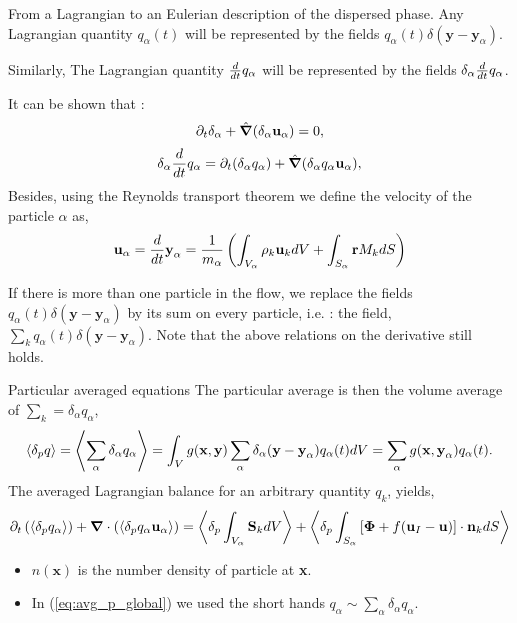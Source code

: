 \documentclass{sintefbeamer}
\newcommand{\nablab}{\bm{\nabla}}
\newcommand{\nablabh}{\hat{\bm{\nabla}}}
\begin{document}
\begin{frame}{From a Lagrangian to an Eulerian description of the dispersed phase.}
  Any Lagrangian quantity $q_\alpha(t)$ will be represented by the fields $q_\alpha(t)\delta(\textbf{y}-\textbf{y}_\alpha)$.

  Similarly, The Lagrangian quantity $\frac{d}{dt} q_\alpha$ will be represented by the fields $\delta_\alpha \frac{d}{dt} q_\alpha$.

  It can be shown that : 
  \begin{equation*}
    \pddt \delta_\alpha
    + \nablabh (\delta_\alpha \textbf{u}_\alpha)
    = 0,
    \label{eq:delta_q_alpha_dt}
\end{equation*}
\begin{equation*}
    \delta_\alpha \ddt q_\alpha
    = \pddt (\delta_\alpha q_\alpha)
    + \nablabh (\delta_\alpha q_\alpha \textbf{u}_\alpha),
    \label{eq:delta_q_alpha_dt}
\end{equation*}
Besides, using the Reynolds transport theorem we define the velocity of the particle $\alpha$ as,  
\begin{equation*}
  \textbf{u}_\alpha
  = \frac{d}{dt} \textbf{y}_\alpha
  = \frac{1}{m_\alpha} \left(
      \int_{V_\alpha} \rho_k \textbf{u}_k dV
      +  \int_{S_\alpha} \textbf{r} M_k dS
  \right)
\end{equation*}

If there is more than one particle in the flow, we replace the fields $q_\alpha(t)\delta(\textbf{y}-\textbf{y}_\alpha)$ by its sum on every particle, i.e. : the field, $\sum_k q_\alpha(t)\delta(\textbf{y}-\textbf{y}_\alpha)$.
Note that the above relations on the derivative still holds.
\end{frame}


\begin{frame}{Particular averaged equations}  
  The particular average is then the volume average of $\sum_k = \delta_\alpha q_\alpha$,
  \begin{equation*}
    \left<\delta_p q\right>
    = \left<\sum_\alpha \delta_\alpha q_\alpha\right> 
    = \int_V g(\textbf{x},\textbf{y}) \sum_\alpha \delta_\alpha(\textbf{y}- \textbf{y}_\alpha) q_\alpha(t) dV 
    =  \sum_\alpha g(\textbf{x},\textbf{y}_\alpha) q_\alpha(t).
\end{equation*}
The averaged Lagrangian balance for an arbitrary quantity $q_k$, yields, 
\begin{equation}
  \pddt   \left(\pavg{q_\alpha}\right)
  + \nablab \cdot \left(\pavg{q_\alpha \textbf{u}_\alpha}\right) 
  = \pavg{\int_{V_\alpha} \textbf{S}_k dV}
  + \pavg{\int_{S_\alpha} \left[\bm{\Phi} + f (\textbf{u}_I-\textbf{u}) \right] \cdot \textbf{n}_k d S}
  \label{eq:avg_p_global}
\end{equation}
\begin{itemize}
  \item $n(\textbf{x})$ is the number density of particle at \textbf{x}.  
  \item In (\ref{eq:avg_p_global}) we used the short hands $q_\alpha \sim \sum_\alpha \delta_\alpha q_\alpha$.
\end{itemize}
\end{frame}
\end{document}

